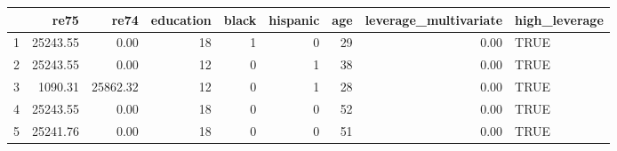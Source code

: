\begin{table}[ht]
\centering
\begin{tabular}{rrrrrrrrl}
  \hline
 & re75 & re74 & education & black & hispanic & age & leverage\_multivariate & high\_leverage \\ 
  \hline
1 & 25243.55 & 0.00 &  18 &   1 &   0 &  29 & 0.00 & TRUE \\ 
  2 & 25243.55 & 0.00 &  12 &   0 &   1 &  38 & 0.00 & TRUE \\ 
  3 & 1090.31 & 25862.32 &  12 &   0 &   1 &  28 & 0.00 & TRUE \\ 
  4 & 25243.55 & 0.00 &  18 &   0 &   0 &  52 & 0.00 & TRUE \\ 
  5 & 25241.76 & 0.00 &  18 &   0 &   0 &  51 & 0.00 & TRUE \\ 
   \hline
\end{tabular}
\end{table}
